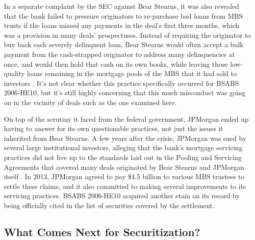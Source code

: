 \documentclass[12pt]{article}
\begin{document}
In a separate complaint by the SEC against Bear Stearns, it was also revealed that the bank failed to pressure originators to re-purchase bad loans from MBS trusts if the loans missed any payments in the deal’s first three months, which was a provision in many deals’ prospectuses. Instead of requiring the originator to buy back each severely delinquent loan, Bear Stearns would often accept a bulk payment from the cash-strapped originator to address many delinquencies at once, and would then hold that cash on its own books, while leaving those low-quality loans remaining in the mortgage pools of the MBS that it had sold to investors \parencite{sec13}. It's not clear whether this practice specifically occurred for BSABS 2006-HE10, but it’s still highly concerning that this much misconduct was going on in the vicinity of deals such as the one examined here.

On top of the scrutiny it faced from the federal government, JPMorgan ended up having to answer for its own questionable practices, not just the issues it inherited from Bear Stearns. A few years after the crisis, JPMorgan was sued by several large institutional investors, alleging that the bank’s mortgage servicing practices did not live up to the standards laid out in the Pooling and Servicing Agreements that covered many deals originated by Bear Stearns and JPMorgan itself \parencite{gibbs13}. In 2013, JPMorgan agreed to pay \$4.5 billion to various MBS trustees to settle these claims, and it also committed to making several improvements to its servicing practices. BSABS 2006-HE10 acquired another stain on its record by being officially cited in the list of securities covered by the settlement.

\subsection*{What Comes Next for Securitization?}
\end{document}
